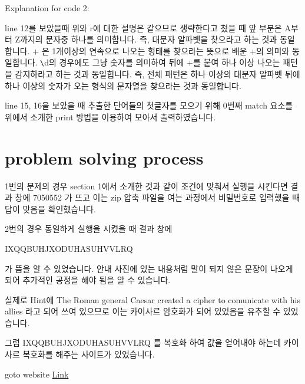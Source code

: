 \documentclass[12pt]{extarticle}
\begin{document}
		

		Explanation for code 2:\newline
		
		line 12를 보았을때 위와 r에 대한 설명은 같으므로 생략한다고 쳤을 때  앞 부분은 A부터 Z까지의 문자중 하나를 의미합니다. 즉, 대문자 알파벳을 찾으라고 하는 것과 동일합니다. + 은 1개이상의 연속으로 나오는 형태를 찾으라는 뜻으로 배운 +의 의미와 동일합니다. \texttt{\textbackslash}d의 경우에도 그냥 숫자를 의미하여 뒤에 +를 붙여 하나 이상 나오는 패턴을 감지하라고 하는 것과 동일힙니다.  즉, 전체 패턴은 하나 이상의 대문자 알파벳 뒤에 하나 이상의 숫자가 오는 형식의 문자열을 찾으라는 것과 동일합니다.\newline

		line 15, 16을 보았을 때 추출한 단어들의 첫글자를 모으기 위해 0번째 match 요소를 위에서 소개한 print 방법을 이용하여 모아서 출력하였습니다.\newline

	\section{problem solving process}
    
	1번의 문제의 경우 section 1에서 소개한 것과 같이 조건에 맞춰서 실행을 시킨다면 결과 창에 7050552 가 뜨고 이는 zip 압축 파일을 여는 과정에서 비밀번호로 입력했을 때 답이 맞음을 확인했습니다. \newline

	2번의 경우 동일하게 실행을 시켰을 때 결과 창에 \newline
	
	IXQQBUHJXODUHASUHVVLRQ \newline
	
	가 뜸을 알 수 있었습니다. 안내 사진에 있는 내용처럼 말이 되지 않은 문장이 나오게 되어 추가적인 공정을 해야 됨을 알 수 있습니다. \newline

	실제로 Hint에 The Roman general Caesar created a cipher to comunicate with his allies 라고 되어 쓰여 있으므로 이는 카이사르 암호화가 되어 있었음을 유추할 수 있었습니다.\newline

	그럼 IXQQBUHJXODUHASUHVVLRQ 를 복호화 하여 값을 얻어내야 하는데 카이사르 복호화를 해주는 사이트가 있었습니다. \newline

	goto website \href{https://jo-gunhee.github.io/website1/dcode/dcodewebsite.html}{Link}\newline
\end{document}
